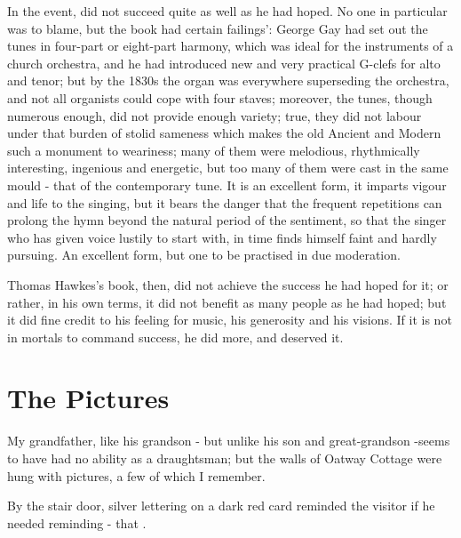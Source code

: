 In the event,  did not succeed quite as well as he had hoped. No one in particular was to blame, but the book had certain failings': George Gay had set out the tunes in four-part or eight-part harmony, which was ideal for the instruments of a church orchestra, and he had introduced new and very practical G-clefs for alto and tenor; but by the 1830s the organ was everywhere superseding the orchestra, and not all organists could cope with four staves; moreover, the tunes, though numerous enough, did not provide enough variety; true, they did not labour under that burden of stolid sameness which makes the old Ancient and Modern such a monument to weariness; many of them were melodious, rhythmically interesting, ingenious and energetic, but too many of them were cast in the same mould - that of the contemporary  tune. It is an excellent form, it imparts vigour and life to the singing, but it bears the danger that the frequent repetitions can prolong the hymn beyond the natural period of the sentiment, so that the singer who has given voice lustily to start with, in time finds himself faint and hardly pursuing. An excellent form, but one to be practised in due moderation.

Thomas Hawkes's book, then, did not achieve the success he had hoped for it; or rather, in his own terms, it did not benefit as many people as he had hoped; but it did fine credit to his feeling for music, his generosity and his visions. If it is not in mortals to command success, he did more, and deserved it.
 
\section{The Pictures}

My grandfather, like his grandson - but unlike his son and great-grandson -seems to have had no ability as a draughtsman; but the walls of Oatway Cottage were hung with pictures, a few of which I remember.

By the stair door, silver lettering on a dark red card reminded the visitor if he needed reminding - that .


